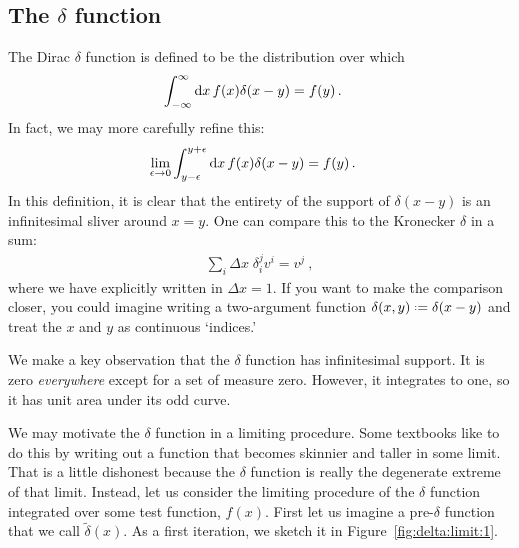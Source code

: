 \begin{subappendices}
\section{\texorpdfstring{The $\delta$ function}{The Delta Function}}

The Dirac $\delta$ function is defined to be the distribution over which
\begin{align}
    \int_{-\infty}^\infty \operatorname{d}\mkern-3mu^{}\mkern-1mu{x}\, f(x)\delta(x-y) &= f(y) \, .
\end{align}
In fact, we may more carefully refine this:
\begin{align}
\lim_{\epsilon \to 0}
    \int_{y-\epsilon}^{y+\epsilon} \operatorname{d}\mkern-3mu^{}\mkern-1mu{x}\, f(x)\delta(x-y) &= f(y) \, .
\end{align}
In this definition, it is clear that the entirety of the support of $\delta(x-y)$ is an infinitesimal sliver around $x=y$. One can compare this to the Kronecker $\delta$ in a sum:
\begin{align}
    \sum_i \Delta x\; \delta^j_i v^i = v^j \ ,
\end{align}
where we have explicitly written in $\Delta x = 1$. If you want to make the comparison closer, you could imagine writing a two-argument function $\delta(x,y)\defeq \delta(x-y)$ and treat the $x$ and $y$ as continuous `indices.'

We make a key observation that the $\delta$ function has infinitesimal support. It is zero \emph{everywhere} except for a set of measure zero. However, it integrates to one, so it has unit area under its odd curve.

We may motivate the $\delta$ function in a limiting procedure. Some textbooks like to do this by writing out a function that becomes skinnier and taller in some limit. That is a little dishonest because the $\delta$ function is really the degenerate extreme of that limit. Instead, let us consider the limiting procedure of the $\delta$ function integrated over some test function, $f(x)$. First let us imagine a pre-$\delta$ function that we call $\tilde \delta(x)$. As a first iteration, we sketch it in Figure~\ref{fig:delta:limit:1}.


\end{subappendices}
